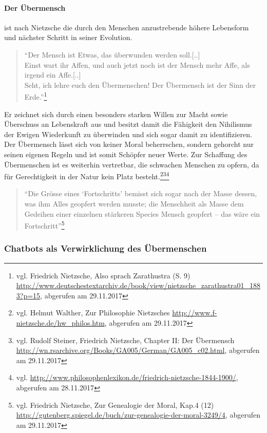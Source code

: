 \paragraph{Der Übermensch} ist nach Nietzsche die durch den Menschen anzustrebende höhere Lebensform und nächster Schritt in seiner Evolution.
\begin{quote}
\enquote{Der Mensch ist Etwas, das überwunden werden soll.[..]\\
Einst wart ihr Affen, und auch jetzt noch ist der Mensch mehr Affe, als irgend ein Affe.[..]\\
Seht, ich lehre euch den Übermenschen! Der Übermensch ist der Sinn der Erde.}\footnote{vgl. Friedrich Nietzsche, Also sprach Zarathustra (S. 9) \url{http://www.deutschestextarchiv.de/book/view/nietzsche_zarathustra01_1883?p=15}, abgerufen am 29.11.2017}
\end{quote}
Er zeichnet sich durch einen besonders starken Willen zur Macht sowie Überschuss an Lebenskraft aus und besitzt damit die Fähigkeit den Nihilismus der Ewigen Wiederkunft zu überwinden und sich sogar damit zu identifizieren.
Der Übermensch lässt sich von keiner Moral beherrschen, sondern gehorcht nur seinen eigenen Regeln und ist somit Schöpfer neuer Werte.
Zur Schaffung des Übermenschen ist es weiterhin vertretbar, die schwachen Menschen zu opfern, da für Gerechtigkeit in der Natur kein Platz besteht.\footnote{vgl. Helmut Walther, Zur Philosophie Nietzsches \url{http://www.f-nietzsche.de/hw_philos.htm}, abgerufen am 29.11.2017}\footnote{vgl. Rudolf Steiner, Friedrich Nietzsche, Chapter II: Der Übermensch \url{http://wn.rsarchive.org/Books/GA005/German/GA005_c02.html}, abgerufen am 29.11.2017}\footnote{vgl. \url{http://www.philosophenlexikon.de/friedrich-nietzsche-1844-1900/}, abgerufen am 28.11.2017}
\begin{quote}
\enquote{Die Grösse eines \enquote{Fortschritts} bemisst sich sogar nach der Masse dessen, was ihm Alles geopfert werden musste; die Menschheit als Masse dem Gedeihen einer einzelnen stärkeren Species Mensch geopfert – das wäre ein Fortschritt}\footnote{vgl. Friedrich Nietzsche, Zur Genealogie der Moral, Kap.4 (12) \url{http://gutenberg.spiegel.de/buch/zur-genealogie-der-moral-3249/4}, abgerufen am 29.11.2017}
\end{quote}

\subsubsection{Chatbots als Verwirklichung des Übermenschen}